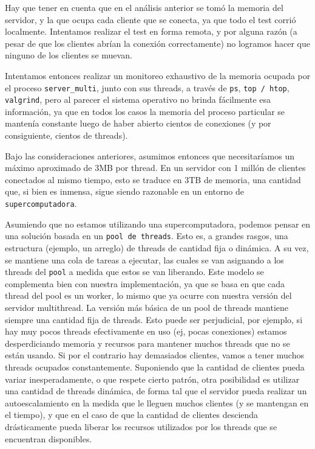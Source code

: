 \documentclass[11pt, a4paper, twoside]{article}
\begin{document}
Hay que tener en cuenta que en el análisis anterior se tomó la memoria del servidor, y la que ocupa cada cliente que se conecta, ya que todo el test corrió localmente. Intentamos realizar el test en forma remota, y por alguna razón (a pesar de que los clientes abrían la conexión correctamente) no logramos hacer que ninguno de los clientes se muevan.

Intentamos entonces realizar un monitoreo exhaustivo de la memoria ocupada por el proceso \texttt{server\_multi}, junto con sus threads, a través de \texttt{ps}, \texttt{top / htop}, \texttt{valgrind}, pero al parecer el sistema operativo no brinda fácilmente esa información, ya que en todos los casos la memoria del proceso particular se mantenía constante luego de haber abierto cientos de conexiones (y por consiguiente, cientos de threads).

Bajo las consideraciones anteriores, asumimos entonces que necesitaríamos un máximo aproximado de 3MB por thread. En un servidor con 1 millón de clientes conectados al mismo tiempo, esto se traduce en 3TB de memoria, una cantidad que, si bien es inmensa, sigue siendo razonable en un entorno de \texttt{supercomputadora}.

Asumiendo que no estamos utilizando una supercomputadora, podemos pensar en una solución basada en un \texttt{pool de threads}. Esto es, a grandes rasgos, una estructura (ejemplo, un arreglo) de threads de cantidad fija o dinámica. A su vez, se mantiene una cola de tareas a ejecutar, las cuales se van asignando a los threads del \texttt{pool} a medida que estos se van liberando. Este modelo se complementa bien con nuestra implementación, ya que se basa en que cada thread del pool es un worker, lo mismo que ya ocurre con nuestra versión del servidor multithread. La versión más básica de un pool de threads mantiene siempre una cantidad fija de threads. Esto puede ser perjudicial, por ejemplo, si hay muy pocos threads efectivamente en uso (ej, pocas conexiones) estamos desperdiciando memoria y recursos para mantener muchos threads que no se están usando. Si por el contrario hay demasiados clientes, vamos a tener muchos threads ocupados constantemente. Suponiendo que la cantidad de clientes pueda variar inesperadamente, o que respete cierto patrón, otra posibilidad es utilizar una cantidad de threads dinámica, de forma tal que el servidor pueda realizar un autoescalamiento en la medida que le lleguen muchos clientes (y se mantengan en el tiempo), y que en el caso de que la cantidad de clientes descienda drásticamente pueda liberar los recursos utilizados por los threads que se encuentran disponibles.
\end{document}
